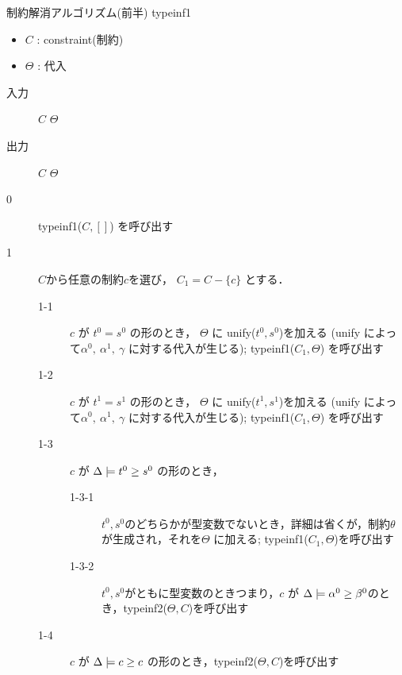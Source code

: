 \begin{oframed}
  制約解消アルゴリズム(前半) typeinf1
  \begin{itemize}
    \setlength{\itemsep}{-5pt}
  \item $C$ : constraint(制約)
  \item $\Theta$ : 代入
  \end{itemize}

  \begin{description}
  \item[入力] $C$ $\Theta$
  \item[出力] $C$ $\Theta$
  \end{description}

  \begin{description}
  \item[0] typeinf1($C, []$) を呼び出す
  \item[1] $C$から任意の制約$c$を選び， $C_1 = C - \{c\}$ とする．
    \begin{description}
    \item[1-1] $c$ が $t^0=s^0$ の形のとき，
      $\Theta$ に unify($t^0, s^0$)を加える (unify によって$\alpha^0,~ \alpha^1,~ \gamma$ に対する代入が生じる);
      typeinf1($C_1, \Theta$) を呼び出す
    \item[1-2] $c$ が $t^1=s^1$ の形のとき，
      $\Theta$ に unify($t^1, s^1$)を加える (unify によって$\alpha^0,~ \alpha^1,~ \gamma$ に対する代入が生じる);
      typeinf1($C_1, \Theta$) を呼び出す
    \item[1-3] $c$ が $\Delta \models {t^0} \ge {s^0}$ の形のとき，
      \begin{description}
      \item[1-3-1] $t^0,s^0$のどちらかが型変数でないとき，詳細は省くが，制約$\theta$ が生成され，それを$\Theta$ に加える;
        typeinf1($C_1, \Theta$)を呼び出す
      \item[1-3-2] $t^0,s^0$がともに型変数のときつまり，$c$ が $\Delta \models {\alpha^0} \ge {\beta^0}$のとき，typeinf2($\Theta, C$)を呼び出す
      \end{description}
    \item[1-4] $c$ が $\Delta \models {c} \ge {c}$ の形のとき，typeinf2($\Theta, C$)を呼び出す
    \end{description}
  \end{description}
\end{oframed}


